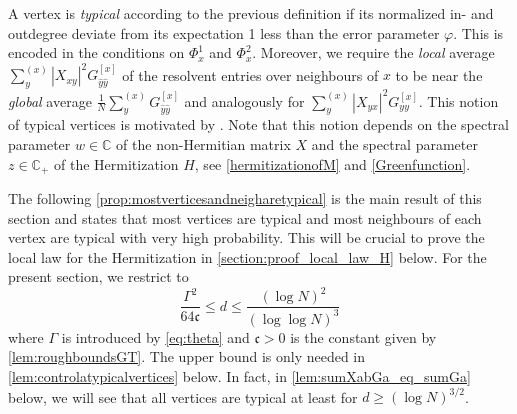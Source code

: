 \documentclass[11pt]{article}
\newcommand{\abs}[1]{\left| #1 \right|}
\newcommand{\C}{\mathbb{C}}
\newcommand{\ccc}{\mathfrak{c}}
\theoremstyle{plain}
\theoremstyle{remark}
\numberwithin{equation}{section}
\newcommand*\ubarr[1]{{\widehat{#1}}}
\newcommand{\nc}{\normalcolor}
\begin{document}
A vertex is \emph{typical} according to the previous definition if its normalized in- and outdegree deviate from its expectation 1 less than the error parameter $\varphi$. This is encoded in the conditions on $\Phi^1_x$ and $\Phi^2_x$. Moreover, we require the \emph{local} average $\sum_{y}^{(x)} \abs{X_{xy}}^2 G_{\ubarr{y}\ubarr{y}}^{[x]}$ of the resolvent entries over neighbours of $x$ 
to be near the \emph{global} average $\frac{1}{N}\sum_{y}^{(x)} G_{\ubarr{y}\ubarr{y}}^{[x]}$ and analogously for $\sum_{y}^{(x)} \abs{X_{yx}}^2 G_{yy}^{[x]}$. 
This notion of typical vertices is motivated by \cite[Definition~4.6]{alt2021delocalization}. Note that this notion depends on the spectral parameter $w \in \C$ of the non-Hermitian matrix $X$ and the spectral parameter $z \in \C_+$ of the Hermitization $H$, see \cref{hermitizationofM} and \cref{Greenfunction}.  

The following \cref{prop:mostverticesandneigharetypical} is the main result of this section 
and states that most vertices are typical and most neighbours of each vertex are typical with very high probability. This will be crucial to prove the local law for the Hermitization in \cref{section:proof_local_law_H} below. 
For the present section, we restrict to 
\begin{equation}\label{eq:regimedlog2}
 \frac{\Gamma^2}{64 \mathfrak c} \leq  d \le \frac{(\log N)^2}{(\log \log N)^3 }
\end{equation}
where $\Gamma$ is introduced by \eqref{eq:theta} and $\ccc>0$ is the constant given by \cref{lem:roughboundsGT}. The upper bound is only needed in \cref{lem:controlatypicalvertices} below. 
In fact, in \cref{lem:sumXabGa_eq_sumGa} below, we will see that all vertices are typical at least for $d \geq (\log N)^{3/2}$. 

\nc 
\end{document}
